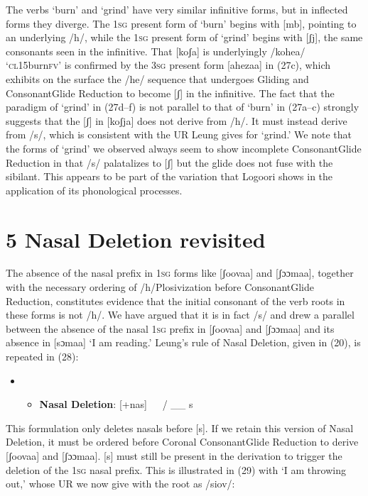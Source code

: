 The verbs ‘burn’ and ‘grind’ have very similar infinitive forms, but in inflected forms they diverge. The 1\textsc{sg} present form of ‘burn’ begins with [mb], pointing to an underlying /h/, while the 1\textsc{sg} present form of ‘grind’ begins with [ʃj], the same consonants seen in the infinitive. That [koʃa] is underlyingly /kohea/ ‘\textsc{cl}15burn\textsc{fv’} is confirmed by the 3\textsc{sg} present form [ahezaa] in (27c), which exhibits on the surface the /he/ sequence that undergoes Gliding and ConsonantGlide Reduction to become [ʃ] in the infinitive. The fact that the paradigm of ‘grind’ in (27d–f) is not parallel to that of ‘burn’ in (27a–c) strongly suggests that the [ʃ] in [koʃja] does not derive from /h/. It must instead derive from /s/, which is consistent with the UR Leung gives for ‘grind.’ We note that the forms of ‘grind’ we observed always seem to show incomplete ConsonantGlide Reduction in that /s/ palatalizes to [ʃ] but the glide does not fuse with the sibilant. This appears to be part of the variation that Logoori shows in the application of its phonological processes.

\chapter{5 Nasal Deletion revisited}

The absence of the nasal prefix in 1\textsc{sg }forms like [ʃoovaa] and [ʃɔɔmaa], together with the necessary ordering of /h/Plosivization before ConsonantGlide Reduction, constitutes evidence that the initial consonant of the verb roots in these forms is not /h/. We have argued that it is in fact /s/ and drew a parallel between the absence of the nasal 1\textsc{sg }prefix in [ʃoovaa] and [ʃɔɔmaa] and its absence in [sɔmaa] ‘I am reading.’ Leung’s rule of Nasal Deletion, given in (20), is repeated in (28):

\setcounter{itemize}{0}
\begin{itemize}
\item \setcounter{itemize}{0}
\begin{itemize}
\item \textbf{Nasal Deletion}: [+nas]   / \_\_ s

\end{itemize}
\end{itemize}

This formulation only deletes nasals before [s]. If we retain this version of Nasal Deletion, it must be ordered before Coronal ConsonantGlide Reduction to derive [ʃoovaa] and [ʃɔɔmaa]. [s] must still be present in the derivation to trigger the deletion of the 1\textsc{sg} nasal prefix. This is illustrated in (29) with ‘I am throwing out,’ whose UR we now give with the root as /siov/:

